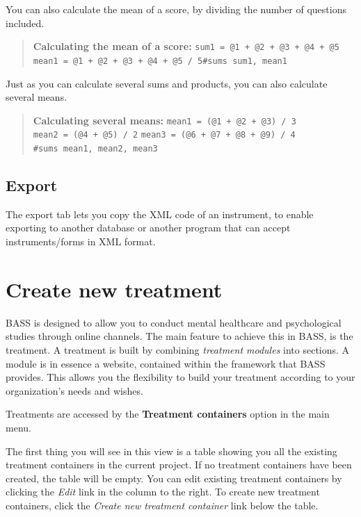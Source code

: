 \documentclass[]{book}
\begin{document}
You can also calculate the mean of a score, by dividing the number of questions included.

\begin{quote}
\textbf{Calculating the mean of a score:} \texttt{sum1\ =\ @1\ +\ @2\ +\ @3\ +\ @4\ +\ @5} \texttt{mean1\ =\ @1\ +\ @2\ +\ @3\ +\ @4\ +\ @5\ /\ 5}\texttt{\#sums\ sum1,\ mean1}
\end{quote}

Just as you can calculate several sums and products, you can also calculate several means.

\begin{quote}
\textbf{Calculating several means:} \texttt{mean1\ =\ (@1\ +\ @2\ +\ @3)\ /\ 3} \texttt{mean2\ =\ (@4\ +\ @5)\ /\ 2} \texttt{mean3\ =\ (@6\ +\ @7\ +\ @8\ +\ @9)\ /\ 4} \texttt{\#sums\ mean1,\ mean2,\ mean3}
\end{quote}

\hypertarget{export}{%
\section{Export}\label{export}}

The export tab lets you copy the XML code of an instrument, to enable exporting to another database or another program that can accept instruments/forms in XML format.

\hypertarget{create-new-treatment}{%
\chapter{Create new treatment}\label{create-new-treatment}}

BASS is designed to allow you to conduct mental healthcare and psychological studies through online channels. The main feature to achieve this in BASS, is the treatment.
A treatment is built by combining \emph{treatment modules} into sections. A module is in essence a website, contained within the framework that BASS provides. This allows you the flexibility to build your treatment according to your organization's needs and wishes.

Treatments are accessed by the \textbf{Treatment containers} option in the main menu.

The first thing you will see in this view is a table showing you all the existing treatment containers in the current project. If no treatment containers have been created, the table will be empty.
You can edit existing treatment containers by clicking the \emph{Edit} link in the column to the right.
To create new treatment containers, click the \emph{Create new treatment container} link below the table.
\end{document}
